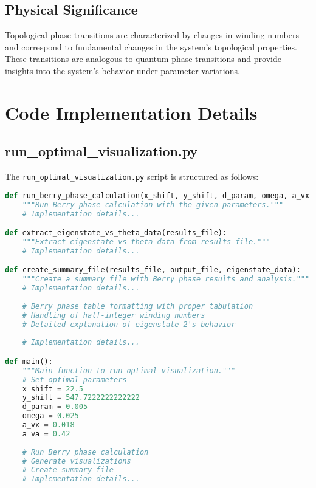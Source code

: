 \documentclass{article}
\begin{document}
\subsection{Physical Significance}

Topological phase transitions are characterized by changes in winding numbers and correspond to fundamental changes in the system's topological properties. These transitions are analogous to quantum phase transitions and provide insights into the system's behavior under parameter variations.

\section{Code Implementation Details}

\subsection{run\_optimal\_visualization.py}

The \texttt{run\_optimal\_visualization.py} script is structured as follows:

\begin{lstlisting}[language=Python, caption=Key components of run\_optimal\_visualization.py]
def run_berry_phase_calculation(x_shift, y_shift, d_param, omega, a_vx, a_va, theta_step=1):
    """Run Berry phase calculation with the given parameters."""
    # Implementation details...

def extract_eigenstate_vs_theta_data(results_file):
    """Extract eigenstate vs theta data from results file."""
    # Implementation details...

def create_summary_file(results_file, output_file, eigenstate_data):
    """Create a summary file with Berry phase results and analysis."""
    # Implementation details...
    
    # Berry phase table formatting with proper tabulation
    # Handling of half-integer winding numbers
    # Detailed explanation of eigenstate 2's behavior
    
    # Implementation details...

def main():
    """Main function to run optimal visualization."""
    # Set optimal parameters
    x_shift = 22.5
    y_shift = 547.7222222222222
    d_param = 0.005
    omega = 0.025
    a_vx = 0.018
    a_va = 0.42
    
    # Run Berry phase calculation
    # Generate visualizations
    # Create summary file
    # Implementation details...
\end{lstlisting}
\end{document}
